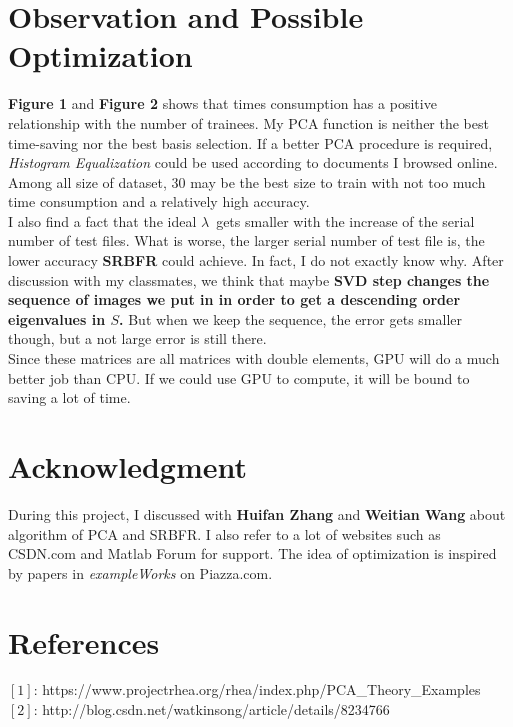 \section{Observation and Possible Optimization}
\textbf{Figure 1} and \textbf{Figure 2} shows that times consumption has a positive relationship with the number of trainees. My PCA function is neither the best time-saving nor the best basis selection. If a better PCA procedure is required, \emph{Histogram Equalization} could be used according to documents I browsed online.
\\
Among all size of dataset, 30 may be the best size to train with not too much time consumption and a relatively high accuracy.
\\
I also find a fact that the ideal \(\lambda\)\ gets smaller with the increase of the serial number of test files. What is worse, the larger serial number of test file is, the lower accuracy \textbf{SRBFR} could achieve. In fact, I do not exactly know why. After discussion with my classmates, we think that maybe \textbf{SVD step changes the sequence of images we put in in order to get a descending order eigenvalues in \(S\).} But when we keep the sequence, the error gets smaller though, but a not large error is still there.
\\
Since these matrices are all matrices with double elements, GPU will do a much better job than CPU. If we could use GPU to compute, it will be bound to saving a lot of time.

\section*{Acknowledgment}
During this project, I discussed with \textbf{Huifan Zhang} and \textbf{Weitian Wang} about algorithm of PCA and SRBFR. I also refer to a lot of websites such as CSDN.com and Matlab Forum for support. The idea of optimization is inspired by papers in \emph{exampleWorks} on Piazza.com.

\section*{References}
\(\left [1 \right ]\): https://www.projectrhea.org/rhea/index.php/PCA\_Theory\_Examples
\\
\(\left [2 \right ]\): http://blog.csdn.net/watkinsong/article/details/8234766


